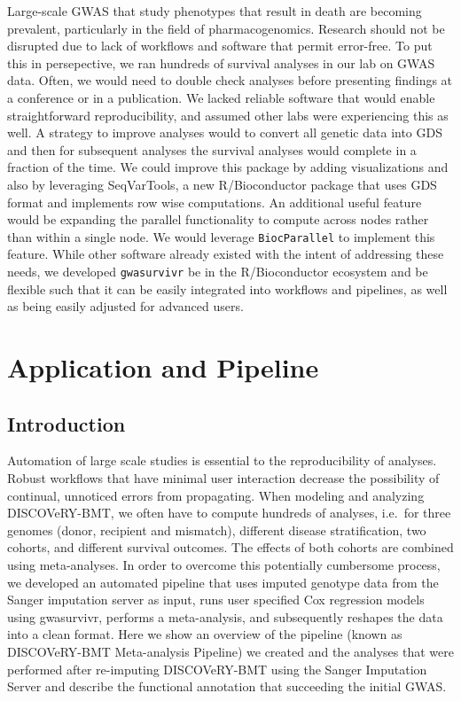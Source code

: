 \documentclass[]{DissertateOSU}
\begin{document}
Large-scale GWAS that study phenotypes that result in death are becoming
prevalent, particularly in the field of pharmacogenomics. Research
should not be disrupted due to lack of workflows and software that
permit error-free. To put this in persepective, we ran hundreds of
survival analyses in our lab on GWAS data. Often, we would need to
double check analyses before presenting findings at a conference or in a
publication. We lacked reliable software that would enable
straightforward reproducibility, and assumed other labs were
experiencing this as well. A strategy to improve analyses would to
convert all genetic data into GDS and then for subsequent analyses the
survival analyses would complete in a fraction of the time. We could
improve this package by adding visualizations and also by leveraging
SeqVarTools, a new R/Bioconductor package that uses GDS format and
implements row wise computations. An additional useful feature would be
expanding the parallel functionality to compute across nodes rather than
within a single node. We would leverage \texttt{BiocParallel} to
implement this feature. While other software already existed with the
intent of addressing these needs, we developed \texttt{gwasurvivr} be in
the R/Bioconductor ecosystem and be flexible such that it can be easily
integrated into workflows and pipelines, as well as being easily
adjusted for advanced users.

\FloatBarrier

\newpage

\pagestyle{plain} \fancyhead[L]{} \fancyhead[R]{}
\fancyfoot[C]{\thepage} \chapter{Application and Pipeline}
\doublespacing

\section{Introduction}\label{introduction-3}

Automation of large scale studies is essential to the reproducibility of
analyses. Robust workflows that have minimal user interaction decrease
the possibility of continual, unnoticed errors from propagating. When
modeling and analyzing DISCOVeRY-BMT, we often have to compute hundreds
of analyses, i.e.~for three genomes (donor, recipient and mismatch),
different disease stratification, two cohorts, and different survival
outcomes. The effects of both cohorts are combined using meta-analyses.
In order to overcome this potentially cumbersome process, we developed
an automated pipeline that uses imputed genotype data from the Sanger
imputation server as input, runs user specified Cox regression models
using gwasurvivr, performs a meta-analysis, and subsequently reshapes
the data into a clean format. Here we show an overview of the pipeline
(known as DISCOVeRY-BMT Meta-analysis Pipeline) we created and the
analyses that were performed after re-imputing DISCOVeRY-BMT using the
Sanger Imputation Server and describe the functional annotation that
succeeding the initial GWAS.
\end{document}
